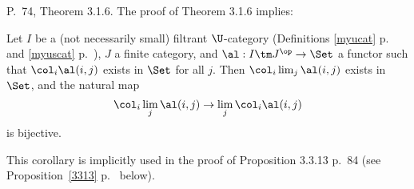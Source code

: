 \documentclass[12pt]{article}
\theoremstyle{remark}
\theoremstyle{definition}
\begin{document}

\begin{s} 
P.~74, Theorem 3.1.6. The proof of Theorem 3.1.6 implies: 
\begin{prop}
Let $I$ be a (not necessarily small) filtrant $\U$-category (Definitions \ref{myucat} p.~ and \ref{myuscat} p.~), $J$ a finite category, and $\al:I\tm J^{\op}\to\Set$ a functor such that $\col_i\al(i,j)$ exists in $\Set$ for all $j$. Then $\col_i\lim_j\al(i,j)$ exists in $\Set$, and the natural map 
$$
\col_i\lim_j\al(i,j)\to
\lim_j\col_i\al(i,j)
$$ 
is bijective. 
\end{prop} 
This corollary is implicitly used in the proof of Proposition 3.3.13 p.~84 (see Proposition~\ref{3313} p.~ below).
\end{s}

%
\end{document}
